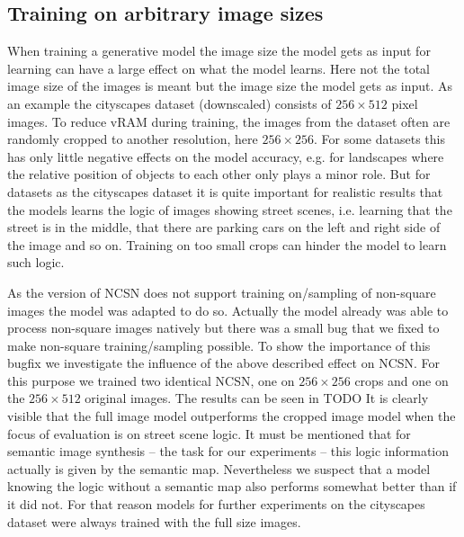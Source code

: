 \subsection{Training on arbitrary image sizes} %
When training a generative model the image size the model gets as input for learning can have a large effect on what the model learns. Here not the total image size of the images is meant but the image size the model gets as input. As an example the cityscapes dataset (downscaled) consists of $256\times512$ pixel images. To reduce vRAM during training, the images from the dataset often are randomly cropped to another resolution, here $256\times256$. For some datasets this has only little negative effects on the model accuracy, e.g. for landscapes where the relative position of objects to each other only plays a minor role. But for datasets as the cityscapes dataset it is quite important for realistic results that the models learns the logic of images showing street scenes, i.e. learning that the street is in the middle, that there are parking cars on the left and right side of the image and so on. Training on too small crops can hinder the model to learn such logic.

As the version of NCSN \cite{score_3} does not support training on/sampling of non-square images the model was adapted to do so. Actually the model already was able to process non-square images natively but there was a small bug that we fixed to make non-square training/sampling possible. To show the importance of this bugfix we investigate the influence of the above described effect on NCSN. For this purpose we trained two identical NCSN, one on $256\times256$ crops and one on the $256\times512$ original images. The results can be seen in TODO It is clearly visible that the full image model outperforms the cropped image model when the focus of evaluation is on street scene logic. It must be mentioned that for semantic image synthesis – the task for our experiments – this logic information actually is given by the semantic map. Nevertheless we suspect that a model knowing the logic without a semantic map also performs somewhat better than if it did not. For that reason models for further experiments on the cityscapes dataset were always trained with the full size images.

